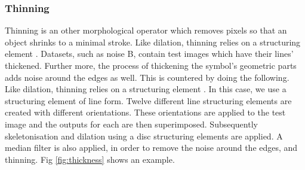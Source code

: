 \subsubsection{Thinning}
Thinning is an other morphological operator which removes pixels so that an object shrinks to a minimal stroke. Like dilation, thinning relies on a structuring element \cite{thinning}. Datasets, such as noise B, contain test images which have their lines' thickened. Further more, the process of thickening the symbol's geometric parts adds noise around the edges as well. This is countered by doing the following. Like dilation, thinning relies on a structuring element \cite{thinning}. In this case, we use a structuring element of line form. Twelve different line structuring elements are created with different orientations. These orientations are applied to the test image and the outputs for each are then superimposed. Subsequently skeletonisation and dilation using a disc structuring elements are applied. A median filter is also applied, in order to remove the noise around the edges, and thinning. Fig \ref{fig:thickness} shows an example.

